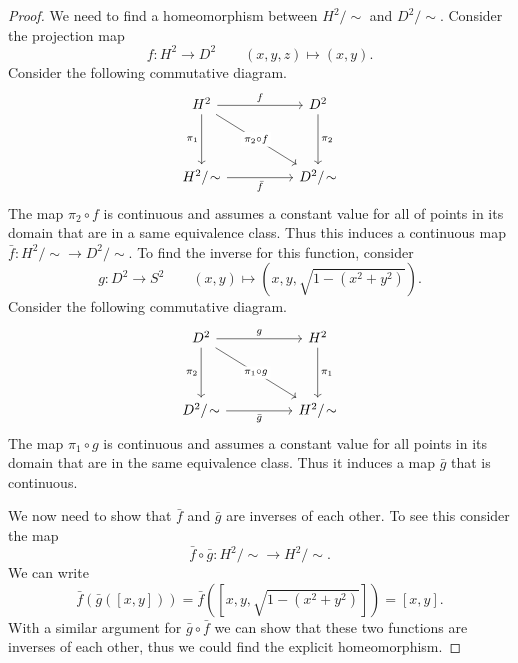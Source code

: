 \begin{proof}
	We need to find a homeomorphism between $ H^2/\sim $ and $ D^2/\sim $. Consider the projection map
	\[ f:H^2 \to D^2 \qquad (x,y,z) \mapsto (x,y).  \]
	Consider the following commutative diagram.
	\[\begin{tikzcd}
		{H^2} && {D^2} \\
		\\
		{H^2/\sim} && {D^2/\sim}
		\arrow["f", from=1-1, to=1-3]
		\arrow["{\pi_1}"', from=1-1, to=3-1]
		\arrow["{\pi_2\circ f}"{description}, from=1-1, to=3-3]
		\arrow["{\pi_2}", from=1-3, to=3-3]
		\arrow["{\bar{f}}"', from=3-1, to=3-3]
	\end{tikzcd}\]
	The map $ \pi_2 \circ f $ is continuous and assumes a constant value for all of points in its domain that are in a same equivalence class. Thus this induces a continuous map $ \bar{f}: H^2 /\sim \to D^2 /\sim $. To find the inverse for this function, consider 
	\[ g: D^2 \to S^2 \qquad (x,y) \mapsto (x,y,\sqrt{1-(x^2+y^2)}). \]
	Consider the following commutative diagram.
	\[\begin{tikzcd}
		{D^2} && {H^2} \\
		\\
		{D^2/\sim} && {H^2/\sim}
		\arrow["g", from=1-1, to=1-3]
		\arrow["{\pi_2}"', from=1-1, to=3-1]
		\arrow["{\pi_1\circ g}"{description}, from=1-1, to=3-3]
		\arrow["{\pi_1}", from=1-3, to=3-3]
		\arrow["{\bar{g}}"', from=3-1, to=3-3]
	\end{tikzcd}\]
	The map $ \pi_1\circ g $ is continuous and assumes a constant value for all points in its domain that are in the same equivalence class. Thus it induces a map $ \bar{g} $ that is continuous.
	
	\noindent We now need to show that $ \bar{f} $ and $ \bar{g} $ are inverses of each other. To see this consider the map 
	\[ \bar{f}\circ\bar{g}: H^2/\sim \to H^2/\sim. \]
	We can write
	\[\bar{f}(\bar{g}([x,y])) = \bar{f}([x,y,\sqrt{1-(x^2+y^2)}]) = [x,y]. \]
	With a similar argument for $ \bar{g}\circ\bar{f} $ we can show that these two functions are inverses of each other, thus we could find the explicit homeomorphism.
\end{proof}

